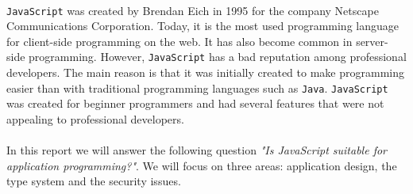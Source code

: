 \paragraph{}
\texttt{JavaScript} was created by Brendan Eich in 1995 for the company Netscape Communications Corporation. Today, it is the most used programming language for client-side programming on the web\cite{w3techs}. It has also become common in server-side programming. However, \texttt{JavaScript} has a bad reputation among professional developers. The main reason is that it was initially created to make programming easier than with traditional programming languages such as \texttt{Java}. \texttt{JavaScript} was created for beginner programmers and had several features that were not appealing to professional developers.
\paragraph{}
In this report we will answer the following question \emph{"Is JavaScript suitable for application programming?"}. We will focus on three areas: application design, the type system and the security issues.
